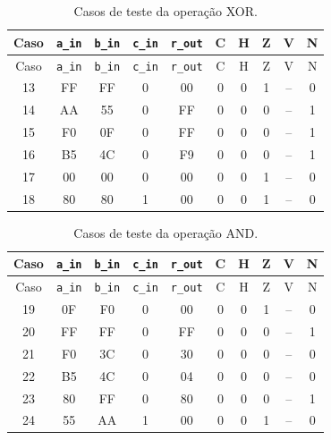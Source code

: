 \begin{longtable}{c c c c c c c c c c}
\caption{Casos de teste da operação XOR.}
\label{tab:testes-XOR}\\
\hline
Caso & \texttt{a\_in} & \texttt{b\_in} & \texttt{c\_in} & \texttt{r\_out} & C & H & Z & V & N \\ \hline
\endfirsthead
\hline
Caso & \texttt{a\_in} & \texttt{b\_in} & \texttt{c\_in} & \texttt{r\_out} & C & H & Z & V & N \\ \hline
\endhead
13 & FF & FF & 0 & 00 & 0 & 0 & 1 & {\footnotesize--} & 0 \\
14 & AA & 55 & 0 & FF & 0 & 0 & 0 & {\footnotesize--} & 1 \\
15 & F0 & 0F & 0 & FF & 0 & 0 & 0 & {\footnotesize--} & 1 \\
16 & B5 & 4C & 0 & F9 & 0 & 0 & 0 & {\footnotesize--} & 1 \\
17 & 00 & 00 & 0 & 00 & 0 & 0 & 1 & {\footnotesize--} & 0 \\
18 & 80 & 80 & 1 & 00 & 0 & 0 & 1 & {\footnotesize--} & 0 \\
\hline
\end{longtable}
\vspace{-0.5cm}

\begin{longtable}{c c c c c c c c c c}
\caption{Casos de teste da operação AND.}
\label{tab:testes-AND}\\
\hline
Caso & \texttt{a\_in} & \texttt{b\_in} & \texttt{c\_in} & \texttt{r\_out} & C & H & Z & V & N \\ \hline
\endfirsthead
\hline
Caso & \texttt{a\_in} & \texttt{b\_in} & \texttt{c\_in} & \texttt{r\_out} & C & H & Z & V & N \\ \hline
\endhead
19 & 0F & F0 & 0 & 00 & 0 & 0 & 1 & {\footnotesize--} & 0 \\
20 & FF & FF & 0 & FF & 0 & 0 & 0 & {\footnotesize--} & 1 \\
21 & F0 & 3C & 0 & 30 & 0 & 0 & 0 & {\footnotesize--} & 0 \\
22 & B5 & 4C & 0 & 04 & 0 & 0 & 0 & {\footnotesize--} & 0 \\
23 & 80 & FF & 0 & 80 & 0 & 0 & 0 & {\footnotesize--} & 1 \\
24 & 55 & AA & 1 & 00 & 0 & 0 & 1 & {\footnotesize--} & 0 \\
\hline
\end{longtable}
\vspace{-0.5cm}

